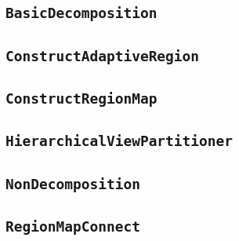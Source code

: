 \subsection{\texttt{BasicDecomposition}}

\subsection{\texttt{ConstructAdaptiveRegion}}

\subsection{\texttt{ConstructRegionMap}}

\subsection{\texttt{HierarchicalViewPartitioner}}

\subsection{\texttt{NonDecomposition}}

\subsection{\texttt{RegionMapConnect}}
